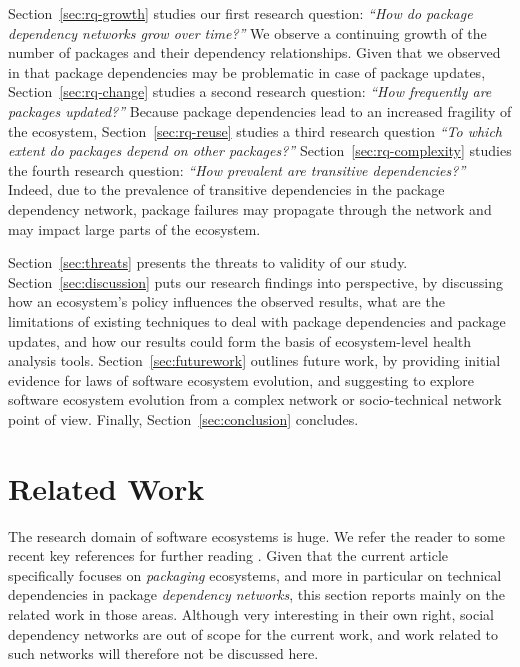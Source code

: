 \documentclass[smallextended]{svjour3}       %
\newcommand{\sect}[1]{Section~\ref{#1}}
\begin{document}
\sect{sec:rq-growth} studies our first research question: \emph{``How do package dependency networks grow over time?''}
We observe a continuing growth of the number of packages and their dependency relationships.
Given that we observed in \cite{Decan2017SANER} that package dependencies may be problematic in case of package updates, \sect{sec:rq-change} studies a second research question: \emph{``How frequently are packages updated?''}
Because package dependencies lead to an increased fragility of the ecosystem, \sect{sec:rq-reuse} studies a third research question \emph{``To which extent do packages depend on other packages?''}
\sect{sec:rq-complexity} studies the fourth research question: \emph{``How prevalent are transitive dependencies?''} Indeed, due to the prevalence of transitive dependencies in the package dependency network, package failures may propagate through the network and may impact large parts of the ecosystem.

\sect{sec:threats} presents the threats to validity of our study.
\sect{sec:discussion} puts our research findings into perspective, by discussing how an ecosystem's policy influences the observed results, what are the limitations of existing techniques to deal with package dependencies and package updates, and how our results could form the basis of ecosystem-level health analysis tools.
\sect{sec:futurework} outlines future work, by providing initial evidence for laws of software ecosystem evolution, and suggesting to explore software ecosystem evolution from a complex network or socio-technical network point of view.
Finally, \sect{sec:conclusion} concludes.



\section{Related Work}\label{sec:related}

The research domain of software ecosystems is huge. We refer the reader to some recent key references for further reading \cite{ManikasHansen2012,Jansen2013softwareecosystems,SerebrenikMens2015}.
%
Given that the current article specifically focuses on \emph{packaging} ecosystems, and more in particular on technical dependencies in package \emph{dependency networks}, this section reports mainly on the related work in those areas. Although very interesting in their own right, social dependency networks are out of scope for the current work, and work related to such networks will therefore not be discussed here.
\end{document}
